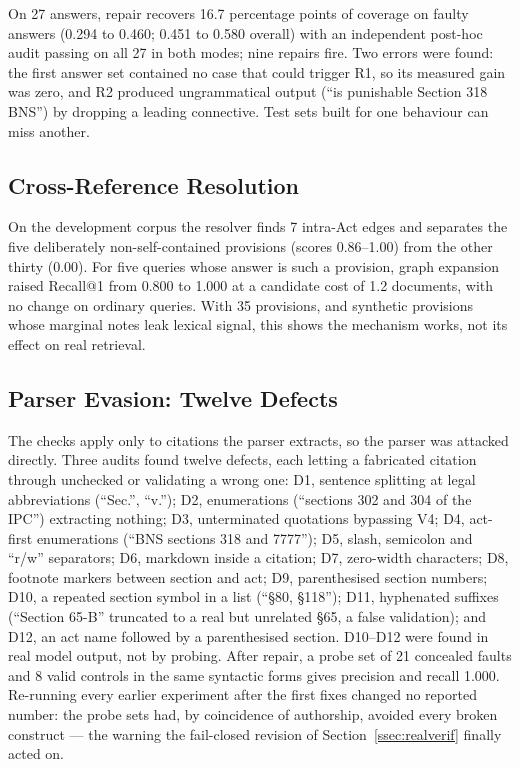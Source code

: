 \documentclass[conference]{IEEEtran}
\begin{document}
On 27 answers, repair recovers 16.7 percentage points of coverage on faulty answers (0.294 to 0.460; 0.451 to 0.580 overall) with an independent post-hoc audit passing on all 27 in both modes; nine repairs fire. Two errors were found: the first answer set contained no case that could trigger R1, so its measured gain was zero, and R2 produced ungrammatical output (``is punishable Section 318 BNS'') by dropping a leading connective. Test sets built for one behaviour can miss another.

\subsection{Cross-Reference Resolution}

On the development corpus the resolver finds 7 intra-Act edges and separates the five deliberately non-self-contained provisions (scores 0.86--1.00) from the other thirty (0.00). For five queries whose answer is such a provision, graph expansion raised Recall@1 from 0.800 to 1.000 at a candidate cost of 1.2 documents, with no change on ordinary queries. With 35 provisions, and synthetic provisions whose marginal notes leak lexical signal, this shows the mechanism works, not its effect on real retrieval.

\subsection{Parser Evasion: Twelve Defects}

The checks apply only to citations the parser extracts, so the parser was attacked directly. Three audits found twelve defects, each letting a fabricated citation through unchecked or validating a wrong one: D1, sentence splitting at legal abbreviations (``Sec.'', ``v.''); D2, enumerations (``sections 302 and 304 of the IPC'') extracting nothing; D3, unterminated quotations bypassing V4; D4, act-first enumerations (``BNS sections 318 and 7777''); D5, slash, semicolon and ``r/w'' separators; D6, markdown inside a citation; D7, zero-width characters; D8, footnote markers between section and act; D9, parenthesised section numbers; D10, a repeated section symbol in a list (``\S80, \S118''); D11, hyphenated suffixes (``Section 65-B'' truncated to a real but unrelated \S65, a false validation); and D12, an act name followed by a parenthesised section. D10--D12 were found in real model output, not by probing. After repair, a probe set of 21 concealed faults and 8 valid controls in the same syntactic forms gives precision and recall 1.000. Re-running every earlier experiment after the first fixes changed no reported number: the probe sets had, by coincidence of authorship, avoided every broken construct --- the warning the fail-closed revision of Section~\ref{ssec:realverif} finally acted on.
\end{document}
